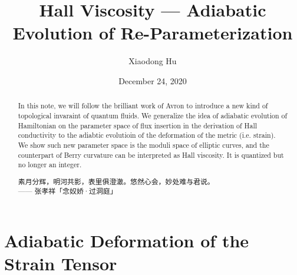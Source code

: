 \documentclass[10pt,nofootinbib,letterpaper]{revtex4}
\newcommand*{\kaishu}{\CJKfamily{kaishu}}
\newcounter{Def}[section]
\begin{document}
\title{Hall Viscosity --- Adiabatic Evolution of Re-Parameterization}
\author{Xiaodong Hu}

\date{December 24, 2020}

\begin{abstract}
	In this note, we will follow the brilliant work of Avron \cite{avron1995viscosity} to introduce a new kind of topological invaraint of quantum fluids. We generalize the idea of adiabatic evolution of Hamiltonian on the parameter space of flux insertion in the derivation of Hall conductivity to the adiabtic evolutioin of the deformation of the metric (i.e. strain). We show such new parameter space is the moduli space of elliptic curves, and the counterpart of Berry curvature can be interpreted as Hall viscosity. It is quantized but no longer an integer.\par
		\hfill\par
		{\centering\kaishu 素月分辉，明河共影，表里俱澄澈。悠然心会，妙处难与君说。\\[0.5em]}
	\hfill------ 张孝祥「念奴娇·过洞庭」
\end{abstract}

\maketitle
\tableofcontents

\section{Adiabatic Deformation of the Strain Tensor}
\end{document}
